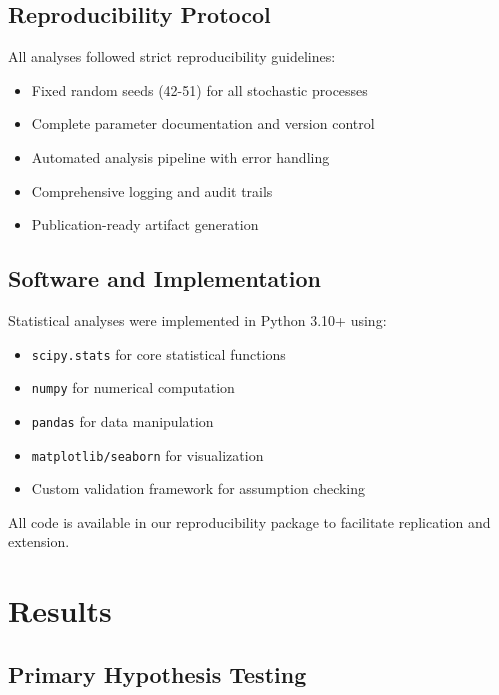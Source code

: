 \documentclass[conference]{IEEEtran}
\begin{document}
\subsection{Reproducibility Protocol}
\label{subsec:reproducibility}

All analyses followed strict reproducibility guidelines:

\begin{itemize}
    \item Fixed random seeds (42-51) for all stochastic processes
    \item Complete parameter documentation and version control
    \item Automated analysis pipeline with error handling
    \item Comprehensive logging and audit trails
    \item Publication-ready artifact generation
\end{itemize}

\subsection{Software and Implementation}
\label{subsec:software}

Statistical analyses were implemented in Python 3.10+ using:
\begin{itemize}
    \item \texttt{scipy.stats} for core statistical functions
    \item \texttt{numpy} for numerical computation  
    \item \texttt{pandas} for data manipulation
    \item \texttt{matplotlib/seaborn} for visualization
    \item Custom validation framework for assumption checking
\end{itemize}

All code is available in our reproducibility package to facilitate replication and extension.


\section{Results}
\label{sec:results}

\subsection{Primary Hypothesis Testing}
\label{subsec:primary_results}
\end{document}
